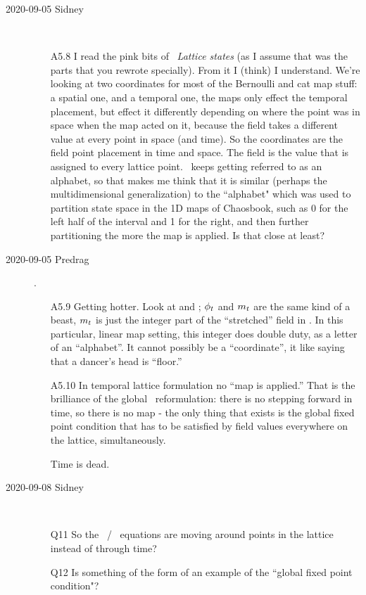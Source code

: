 \begin{description}
\item[2020-09-05 Sidney]~~
\begin{itemize}
	\item[A5.8]
I read the pink bits of ~{\em Lattice states} (as I
assume that was the parts that you rewrote specially). From it I (think)
I understand. We're looking at two coordinates for most of the Bernoulli
and cat map stuff: a spatial one, and a temporal one, the maps only
effect the temporal placement, but effect it differently depending on
where the point was in space when the map acted on it, because the field
takes a different value at every point in space (and time). So the
coordinates are the field point placement in time and space. The field is
the value that is assigned to every lattice point. \Mm\ keeps getting
referred to as an alphabet, so that makes me think that it is similar
(perhaps the multidimensional generalization) to the ``alphabet" which was
used to partition state space in the 1D maps of Chaosbook, such as 0 for
the left half of the interval and 1 for the right, and then further
partitioning the more the map is applied. Is that close at least?
\end{itemize}

\item[2020-09-05 Predrag].
\begin{itemize}
	\item[A5.9]
Getting hotter. Look at  and ;
$\phi_{t}$ and ${m_{t}}$ are the same kind of a beast,
${m_{t}}$ is just the integer part of the ``stretched'' field in
. In this particular, linear map setting, this integer
does double duty, as a letter of an ``alphabet''. It cannot possibly be a
``coordinate'', it like saying that a dancer's head is ``floor.''
	\item[A5.10]
In temporal lattice formulation no ``map is applied.'' That is the
brilliance of the global \spt\ reformulation: there is no stepping
forward in time, so there is no map - the only thing that exists is the
global fixed point condition that has to be satisfied by field values
everywhere on the lattice, simultaneously.

Time is dead.
\end{itemize}

\item[2020-09-08 Sidney]~~
\begin{itemize}
	\item[Q11]
So the \templatt\ / \catlatt\ equations are moving around points in the lattice instead of
through time?
	\item[Q12]
Is something of the form of  an example
of the ``global fixed point condition"?
\end{itemize}


\end{description}
